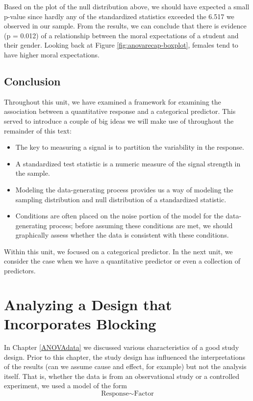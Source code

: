 \documentclass[]{book}
\providecommand{\tightlist}{%
  \setlength{\itemsep}{0pt}\setlength{\parskip}{0pt}}
\theoremstyle{definition}
\theoremstyle{definition}
\theoremstyle{definition}
\theoremstyle{remark}
\begin{document}
Based on the plot of the null distribution above, we should have
expected a small p-value since hardly any of the standardized statistics
exceeded the 6.517 we observed in our sample. From the results, we can
conclude that there is evidence (p = 0.012) of a relationship between
the moral expectations of a student and their gender. Looking back at
Figure \ref{fig:anovarecap-boxplot}, females tend to have higher moral
expectations.

\section{Conclusion}\label{conclusion}

Throughout this unit, we have examined a framework for examining the
association between a quantitative response and a categorical predictor.
This served to introduce a couple of big ideas we will make use of
throughout the remainder of this text:

\begin{itemize}
\tightlist
\item
  The key to measuring a signal is to partition the variability in the
  response.
\item
  A standardized test statistic is a numeric measure of the signal
  strength in the sample.
\item
  Modeling the data-generating process provides us a way of modeling the
  sampling distribution and null distribution of a standardized
  statistic.
\item
  Conditions are often placed on the noise portion of the model for the
  data-generating process; before assuming these conditions are met, we
  should graphically assess whether the data is consistent with these
  conditions.
\end{itemize}

Within this unit, we focused on a categorical predictor. In the next
unit, we consider the case when we have a quantitative predictor or even
a collection of predictors.

\chapter{Analyzing a Design that Incorporates
Blocking}\label{ANOVAblocking}

In Chapter \ref{ANOVAdata} we discussed various characteristics of a
good study design. Prior to this chapter, the study design has
influenced the interpretations of the results (can we assume cause and
effect, for example) but not the analysis itself. That is, whether the
data is from an observational study or a controlled experiment, we used
a model of the form \[\text{Response} \sim \text{Factor}\]
\end{document}
